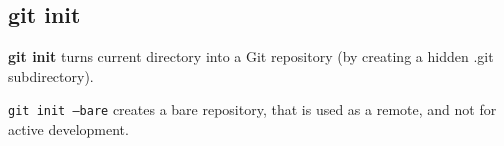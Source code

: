 %

\subsection{git init}
\textbf{git init} turns current directory into a Git repository (by creating a hidden .git subdirectory).

\texttt{git init --bare} creates a bare repository, that is used as a remote, and not for active development.

%